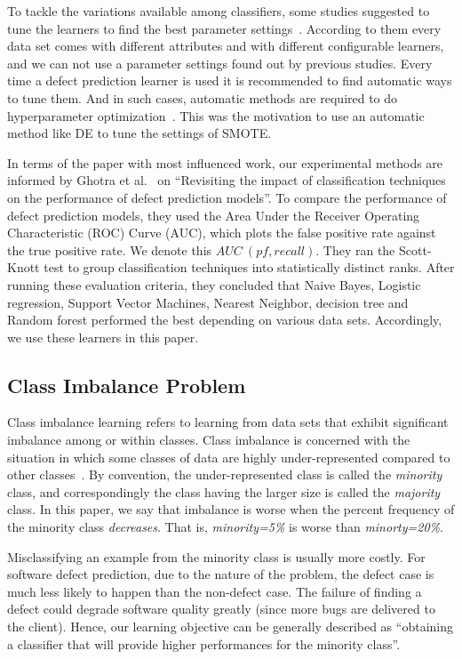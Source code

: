 \documentclass[sigconf,review, anonymous]{acmart}
\theoremstyle{break}
\theoremstyle{break}
\begin{document}
To tackle the variations available among classifiers, some studies suggested to tune the learners to find the best parameter settings~\cite{tantithamthavorn2016automated, fu2016tuning}.  According to them every data set comes with different attributes and with different configurable learners, and we can not use a parameter settings found out by previous studies. Every time a defect prediction learner is used it is recommended to find automatic ways to tune them. And in such cases, automatic 
methods are required to do hyperparameter optimization~\cite{agrawal2016wrong, fu2016tuning}. This was the motivation to use an automatic method like DE to
tune the settings of SMOTE.

In terms of the paper with most influenced work,
our experimental methods are informed 
by  Ghotra et al.~\cite{ghotra2015revisiting} on ``Revisiting the impact of classification techniques on the performance of defect prediction models''. To 
compare  the  performance  of  defect prediction  models,  they  used  the  Area  Under  the Receiver Operating Characteristic (ROC) Curve (AUC), which plots  the  false  positive  rate  against  the  true  positive rate. We denote this $AUC\ (pf, recall)$. 
They ran the Scott-Knott test to group classification techniques into statistically distinct ranks. After running these evaluation criteria, they concluded that Naive Bayes, Logistic regression, Support Vector Machines, Nearest Neighbor, decision tree and Random forest performed the best depending on various data sets. Accordingly, 
we use these learners in this paper.

\subsection{Class Imbalance Problem}
\label{sect:motivation}

Class imbalance learning refers to learning from data sets that exhibit significant imbalance among or within classes. Class imbalance  is concerned with the situation in which some classes of data are
highly under-represented compared to other classes~\cite{he2009learning}. By convention,
the under-represented class is called the {\em minority} class,
and correspondingly the class having the larger size is called the
{\em majority} class. In this paper, we say that imbalance is worse when the percent frequency of
the minority class {\em decreases}. That is,
{\em minority=5\%} is worse than {\em minorty=20\%}.

Misclassifying an example from the minority class is usually more costly. For software defect prediction, due to the nature of the problem, the defect case is much less likely to happen than the non-defect case.  The failure of finding a defect could degrade software quality greatly (since more bugs
are delivered to the client). Hence,
our learning objective can be generally described
as ``obtaining a classifier that will provide higher performances for the minority class''.
\end{document}
